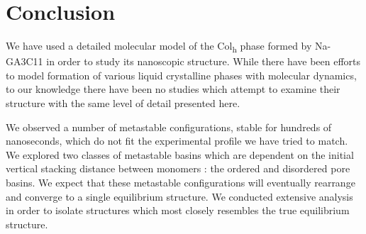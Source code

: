 \documentclass[journal=jpcbfk,manuscript=article]{achemso}
\begin{document}
 
  \section{Conclusion}
  
  We have used a detailed molecular model of the Col\textsubscript{h} phase
  formed by Na-GA3C11 in order to study its nanoscopic structure. While there
  have been efforts to model formation of various liquid crystalline phases with
  molecular dynamics, to our knowledge there have been no studies which attempt
  to examine their structure with the same level of detail presented here.
  
  We observed a number of metastable configurations, stable for hundreds of 
  nanoseconds, which do not fit the experimental profile we have tried to match. 
  We explored two classes of metastable basins which are dependent on the initial
  vertical stacking distance between monomers : the ordered and disordered pore basins.
  We expect that these metastable configurations will eventually rearrange and converge
  to a single equilibrium structure. We conducted extensive analysis in order to 
  isolate structures which most closely resembles the true equilibrium structure.
\end{document}
